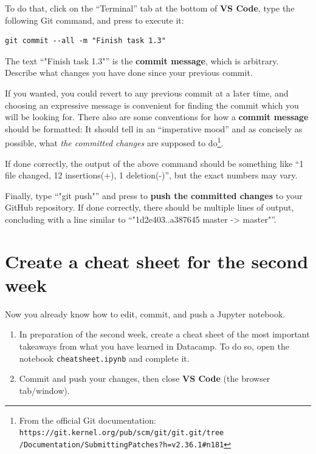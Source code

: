 \documentclass[12pt,a4paper]{article}
\begin{document}
To do that, click on the ``Terminal'' tab at the bottom of \textbf{VS Code}, type the following Git command, and press \Return to execute it:
\begin{Verbatim}[frame=single]
git commit --all -m "Finish task 1.3"
\end{Verbatim}
The text ``"Finish task 1.3"'' is the \textbf{commit message}, which is arbitrary. Describe what changes you have done since your previous commit.

If you wanted, you could revert to any previous commit at a later time, and choosing an expressive message is convenient for finding the commit which you will be looking for. There also are some conventions for how a \textbf{commit message} should be formatted: It should tell in an ``imperative mood'' and as concisely as possible, what \emph{the committed changes} are supposed to do\footnote{From the official Git documentation: \texttt{https://git.kernel.org/pub/scm/git/git.git/tree\\/Documentation/SubmittingPatches?h=v2.36.1\#n181}}.

If done correctly, the output of the above command should be something like ``1 file changed, 12 insertions(+), 1 deletion(-)'', but the exact numbers may vary.

Finally, type ``"git push"'' and press \Return to \textbf{push the committed changes} to your GitHub repository. If done correctly, there should be multiple lines of output, concluding with a line similar to ``"1d2e403..a387645 master -> master"''.

\section{Create a cheat sheet for the second week}
Now you already know how to edit, commit, and push a Jupyter notebook.
\begin{enumerate}
    \item In preparation of the second week, create a cheat sheet of the most important takeaways from what you have learned in Datacamp. To do so, open the notebook \texttt{cheatsheet.ipynb} and complete it.
    \item Commit and push your changes, then close \textbf{VS Code} (the browser tab/window).
\end{enumerate}
\end{document}
